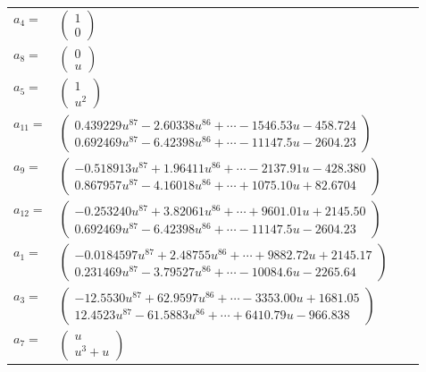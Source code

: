 \documentclass[1p]{elsarticle_modified}
\theoremstyle{definition}
\begin{document}
\begin{tabular}{m{7pt} m{180pt} m{7pt} m{180pt} }
\flushright $a_{4}=$&$\begin{pmatrix}1\\0\end{pmatrix}$ \\
\flushright $a_{8}=$&$\begin{pmatrix}0\\u\end{pmatrix}$ \\
\flushright $a_{5}=$&$\begin{pmatrix}1\\u^2\end{pmatrix}$ \\
\flushright $a_{11}=$&$\begin{pmatrix}0.439229 u^{87}-2.60338 u^{86}+\cdots-1546.53 u-458.724\\0.692469 u^{87}-6.42398 u^{86}+\cdots-11147.5 u-2604.23\end{pmatrix}$ \\
\flushright $a_{9}=$&$\begin{pmatrix}-0.518913 u^{87}+1.96411 u^{86}+\cdots-2137.91 u-428.380\\0.867957 u^{87}-4.16018 u^{86}+\cdots+1075.10 u+82.6704\end{pmatrix}$ \\
\flushright $a_{12}=$&$\begin{pmatrix}-0.253240 u^{87}+3.82061 u^{86}+\cdots+9601.01 u+2145.50\\0.692469 u^{87}-6.42398 u^{86}+\cdots-11147.5 u-2604.23\end{pmatrix}$ \\
\flushright $a_{1}=$&$\begin{pmatrix}-0.0184597 u^{87}+2.48755 u^{86}+\cdots+9882.72 u+2145.17\\0.231469 u^{87}-3.79527 u^{86}+\cdots-10084.6 u-2265.64\end{pmatrix}$ \\
\flushright $a_{3}=$&$\begin{pmatrix}-12.5530 u^{87}+62.9597 u^{86}+\cdots-3353.00 u+1681.05\\12.4523 u^{87}-61.5883 u^{86}+\cdots+6410.79 u-966.838\end{pmatrix}$ \\
\flushright $a_{7}=$&$\begin{pmatrix}u\\u^3+u\end{pmatrix}$ \\

\end{tabular}
\end{document}
